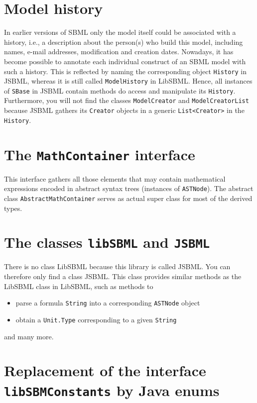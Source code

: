 \documentclass[
  letterpaper,
  11pt,
  headsepline,
  pointlessnumbers,
  tablecaptionabove,
  headinclude,
  appendixprefix,
  idxtotoc,
  bibtotoc
]{scrartcl}
\begin{document}
\section{Model history}

In earlier versions of SBML only the model itself could be associated with a
history, i.e., a description about the person(s) who build this model, including
names, e-mail addresses, modification and creation dates. Nowadays, it has
become possible to annotate each individual construct of an SBML model with such
a history. This is reflected by naming the corresponding object \verb!History!
in JSBML, whereas it is still called \verb!ModelHistory! in LibSBML. Hence, all
instances of \verb!SBase! in JSBML contain methods do access and manipulate its
\verb!History!. Furthermore, you will not find the classes \verb!ModelCreator!
and \verb!ModelCreatorList! because JSBML gathers its \verb!Creator! objects
in a generic \verb!List<Creator>! in the \verb!History!.

\section{The \texttt{MathContainer} interface}

This interface gathers all those elements that may contain mathematical
expressions encoded in abstract syntax trees (instances of \verb!ASTNode!).
The abstract class \verb!AbstractMathContainer! serves as actual super class
for most of the derived types.
 

\section{The classes \texttt{libSBML} and \texttt{JSBML}}

There is no class LibSBML because this library is called JSBML. You
can therefore only find a class JSBML. This class provides similar
methods as the LibSBML class in LibSBML, such as methods to
\begin{itemize}
 \item parse a formula \verb!String! into a corresponding \verb!ASTNode! object
 \item obtain a \verb!Unit.Type! corresponding to a given \verb!String!
\end{itemize}
and many more.


\section{Replacement of the interface \texttt{libSBMConstants} by Java enums}
\end{document}
